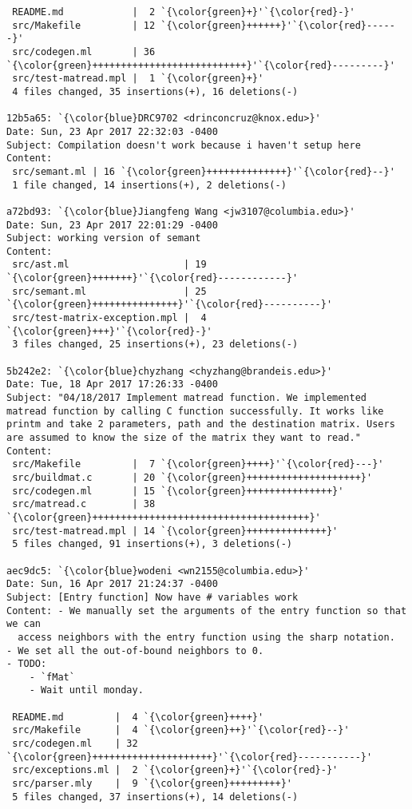 \begin{lstlisting}
 README.md            |  2 `{\color{green}+}'`{\color{red}-}'
 src/Makefile         | 12 `{\color{green}++++++}'`{\color{red}------}'
 src/codegen.ml       | 36 `{\color{green}+++++++++++++++++++++++++++}'`{\color{red}---------}'
 src/test-matread.mpl |  1 `{\color{green}+}'
 4 files changed, 35 insertions(+), 16 deletions(-)

12b5a65: `{\color{blue}DRC9702 <drinconcruz@knox.edu>}'
Date: Sun, 23 Apr 2017 22:32:03 -0400
Subject: Compilation doesn't work because i haven't setup here
Content: 
 src/semant.ml | 16 `{\color{green}++++++++++++++}'`{\color{red}--}'
 1 file changed, 14 insertions(+), 2 deletions(-)

a72bd93: `{\color{blue}Jiangfeng Wang <jw3107@columbia.edu>}'
Date: Sun, 23 Apr 2017 22:01:29 -0400
Subject: working version of semant
Content: 
 src/ast.ml                    | 19 `{\color{green}+++++++}'`{\color{red}------------}'
 src/semant.ml                 | 25 `{\color{green}+++++++++++++++}'`{\color{red}----------}'
 src/test-matrix-exception.mpl |  4 `{\color{green}+++}'`{\color{red}-}'
 3 files changed, 25 insertions(+), 23 deletions(-)

5b242e2: `{\color{blue}chyzhang <chyzhang@brandeis.edu>}'
Date: Tue, 18 Apr 2017 17:26:33 -0400
Subject: "04/18/2017 Implement matread function. We implemented matread function by calling C function successfully. It works like printm and take 2 parameters, path and the destination matrix. Users are assumed to know the size of the matrix they want to read."
Content: 
 src/Makefile         |  7 `{\color{green}++++}'`{\color{red}---}'
 src/buildmat.c       | 20 `{\color{green}++++++++++++++++++++}'
 src/codegen.ml       | 15 `{\color{green}+++++++++++++++}'
 src/matread.c        | 38 `{\color{green}++++++++++++++++++++++++++++++++++++++}'
 src/test-matread.mpl | 14 `{\color{green}++++++++++++++}'
 5 files changed, 91 insertions(+), 3 deletions(-)

aec9dc5: `{\color{blue}wodeni <wn2155@columbia.edu>}'
Date: Sun, 16 Apr 2017 21:24:37 -0400
Subject: [Entry function] Now have # variables work
Content: - We manually set the arguments of the entry function so that we can
  access neighbors with the entry function using the sharp notation.
- We set all the out-of-bound neighbors to 0.
- TODO:
    - `fMat`
    - Wait until monday.

 README.md         |  4 `{\color{green}++++}'
 src/Makefile      |  4 `{\color{green}++}'`{\color{red}--}'
 src/codegen.ml    | 32 `{\color{green}+++++++++++++++++++++}'`{\color{red}-----------}'
 src/exceptions.ml |  2 `{\color{green}+}'`{\color{red}-}'
 src/parser.mly    |  9 `{\color{green}+++++++++}'
 5 files changed, 37 insertions(+), 14 deletions(-)


\end{lstlisting}
